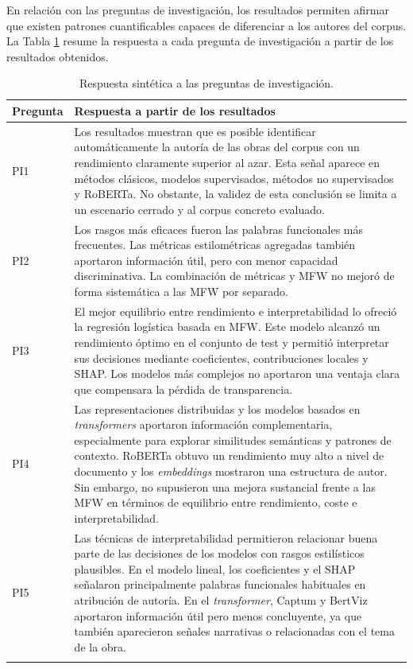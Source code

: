 \documentclass[IB]{TFUOC}%
\begin{document}
En relación con las preguntas de investigación, los resultados permiten afirmar que existen patrones cuantificables capaces de diferenciar a los autores del corpus. La Tabla \ref{tab:respuesta-preguntas-investigacion} resume la respuesta a cada pregunta de investigación a partir de los resultados obtenidos.

\begin{longtable}{|p{2cm}|p{14cm}|}
\hline
\textbf{Pregunta} & \textbf{Respuesta a partir de los resultados} \\
\hline
PI1 & Los resultados muestran que es posible identificar automáticamente la autoría de las obras del corpus con un rendimiento claramente superior al azar. Esta señal aparece en métodos clásicos, modelos supervisados, métodos no supervisados y RoBERTa. No obstante, la validez de esta conclusión se limita a un escenario cerrado y al corpus concreto evaluado. \\
\hline
PI2 & Los rasgos más eficaces fueron las palabras funcionales más frecuentes. Las métricas estilométricas agregadas también aportaron información útil, pero con menor capacidad discriminativa. La combinación de métricas y MFW no mejoró de forma sistemática a las MFW por separado. \\
\hline
PI3 & El mejor equilibrio entre rendimiento e interpretabilidad lo ofreció la regresión logística basada en MFW. Este modelo alcanzó un rendimiento óptimo en el conjunto de test y permitió interpretar sus decisiones mediante coeficientes, contribuciones locales y SHAP. Los modelos más complejos no aportaron una ventaja clara que compensara la pérdida de transparencia. \\
\hline
PI4 & Las representaciones distribuidas y los modelos basados en \textit{transformers} aportaron información complementaria, especialmente para explorar similitudes semánticas y patrones de contexto. RoBERTa obtuvo un rendimiento muy alto a nivel de documento y los \textit{embeddings} mostraron una estructura de autor. Sin embargo, no supusieron una mejora sustancial frente a las MFW en términos de equilibrio entre rendimiento, coste e interpretabilidad. \\
\hline
PI5 & Las técnicas de interpretabilidad permitieron relacionar buena parte de las decisiones de los modelos con rasgos estilísticos plausibles. En el modelo lineal, los coeficientes y el SHAP señalaron principalmente palabras funcionales habituales en atribución de autoría. En el \textit{transformer}, Captum y BertViz aportaron información útil pero menos concluyente, ya que también aparecieron señales narrativas o relacionadas con el tema de la obra. \\
\hline
\caption{Respuesta sintética a las preguntas de investigación.}
\label{tab:respuesta-preguntas-investigacion}
\end{longtable}
\end{document}

